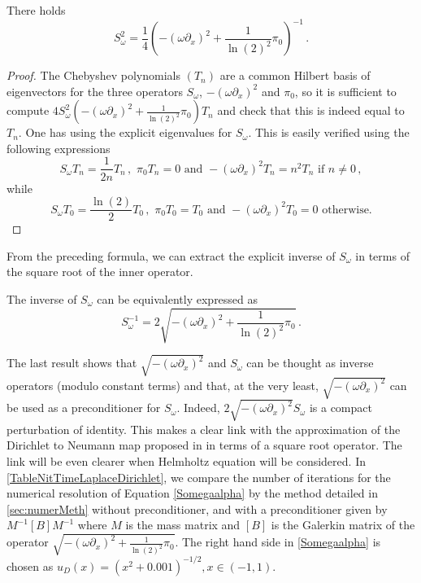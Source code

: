 \documentclass[a4paper]{article}
\begin{document}
\begin{The}
	\label{TheSdx2S}
	There holds
	\begin{equation}
		\label{Sdx2S}
		S_{\omega}^2 = \frac{1}{4}\left(-(\omega\partial_x)^2 + \frac{1}{\ln(2)^2} \pi_0 \right)^{-1}\,.
	\end{equation}
\end{The}
\begin{proof}
	The Chebyshev polynomials $(T_n)$ are a common Hilbert basis of eigenvectors for the three operators $S_\omega$, $-(\omega \partial_x)^2$ and $\pi_0$, so it is sufficient to compute $4 S_\omega^2 \left(-(\omega\partial_x)^2 + \frac{1}{\ln(2)^2} \pi_0 \right) T_n$ and check that this is indeed equal to $T_n$. 
	One has using the explicit eigenvalues for $S_\omega$. This is easily verified using the following expressions
	\[ S_\omega T_n =\frac{1}{2n}T_n\,,\,\, \pi_0 T_n = 0 \mbox{ and } -(\omega\partial_x)^2T_n = n^2 T_n \mbox{ if } n\ne 0\,,\]
	while
	\[ S_\omega T_0 = \frac{\ln(2)}{2} T_0\,,\,\, \pi_0 T_0 = T_0 \mbox{ and } -(\omega\partial_x)^2T_0 = 0 \mbox{ otherwise.}\]
\end{proof}

From the preceding formula, we can extract the explicit inverse of $S_\omega$ in terms of the square root of the inner operator. 

\begin{Cor}
	The inverse of $S_\omega$ can be equivalently expressed as 
	\begin{equation}
	S_{\omega}^{-1} = 2\sqrt{-(\omega \partial_x)^2 + \frac{1}{\ln(2)^2}\pi_0}\,.
	\end{equation}
\end{Cor}

The last result shows that $\sqrt{-(\omega \partial_x)^2}$ and $S_\omega$ can be thought as inverse operators (modulo constant terms) and that, at the very least, $\sqrt{-(\omega \partial_x)^2}$ can be used as a preconditioner for $S_\omega$. Indeed, $2\sqrt{-(\omega \partial_x)^2}S_\omega$ is a compact perturbation of identity. This makes a clear link with the approximation of the Dirichlet to Neumann map proposed in \cite{antoine2007generalized} in terms of a square root operator. The link will be even clearer when Helmholtz equation will be considered. In \autoref{TableNitTimeLaplaceDirichlet}, we compare the number of iterations for the numerical resolution of Equation \eqref{Somegaalpha} by the method detailed in \autoref{sec:numerMeth} without preconditioner, and with a preconditioner given by $M^{-1} \left[B \right] M^{-1}$ where $M$ is the mass matrix and $\left[ B \right]$ is the Galerkin matrix of the operator $\sqrt{ -(\omega \partial_x)^2 + \frac{1}{\ln(2)^2} \pi_0}$. The right hand side in \eqref{Somegaalpha} is chosen as $u_D(x) = (x^2 + 0.001)^{-1/2}, x \in (-1,1)$.
	
\end{document}
